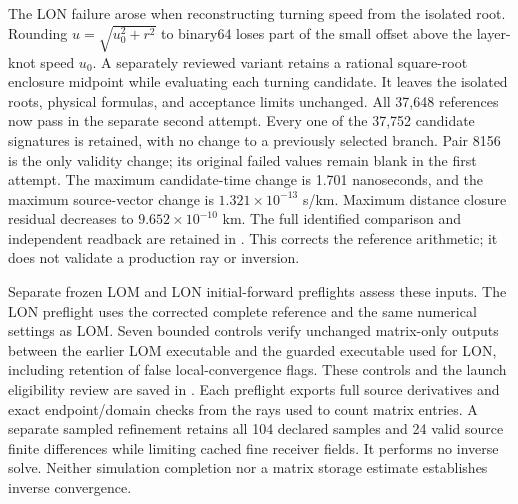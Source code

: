The LON failure arose when reconstructing turning speed from the isolated
root. Rounding $u=\sqrt{u_0^2+r^2}$ to binary64 loses part of the small
offset above the layer-knot speed $u_0$. A separately reviewed variant retains
a rational square-root enclosure midpoint while evaluating each turning
candidate. It leaves the isolated roots, physical formulas, and acceptance
limits unchanged. All 37,648 references now pass in the separate second
attempt. Every one of the 37,752 candidate signatures is retained, with no
change to a previously selected branch. Pair 8156 is the only validity
change; its original failed values remain blank in the first attempt.
The maximum candidate-time change is 1.701 nanoseconds, and the maximum
source-vector change is $1.321\times10^{-13}$ s/km. Maximum distance closure
residual decreases to $9.652\times10^{-10}$ km. The full identified comparison
and independent readback are retained in
. This corrects the
reference arithmetic; it does not validate a production ray or inversion.

Separate frozen LOM and LON initial-forward preflights assess these inputs.
The LON preflight uses the corrected complete reference and the same numerical
settings as LOM. Seven bounded controls verify unchanged matrix-only outputs
between the earlier LOM executable and the guarded executable used for LON,
including retention of false local-convergence flags. These controls and
the launch eligibility review are saved in
.
Each preflight exports full source
derivatives and exact endpoint/domain checks from the rays used to count matrix
entries. A separate sampled refinement retains all 104 declared samples and
24 valid source finite differences while limiting cached fine receiver fields.
It performs no inverse solve. Neither simulation completion nor a matrix
storage estimate establishes inverse convergence.

